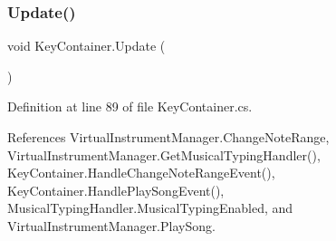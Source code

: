 \mbox{\label{group___key_contain_unity_gae0e513a4ef9fd25c1e0f5f3bc53d9b5c}} 
\subsubsection{\texorpdfstring{Update()}{Update()}}
{\footnotesize\ttfamily void Key\+Container.\+Update (\begin{DoxyParamCaption}{ }\end{DoxyParamCaption})\hspace{0.3cm}{\ttfamily [private]}}



Definition at line 89 of file Key\+Container.\+cs.



References Virtual\+Instrument\+Manager.\+Change\+Note\+Range, Virtual\+Instrument\+Manager.\+Get\+Musical\+Typing\+Handler(), Key\+Container.\+Handle\+Change\+Note\+Range\+Event(), Key\+Container.\+Handle\+Play\+Song\+Event(), Musical\+Typing\+Handler.\+Musical\+Typing\+Enabled, and Virtual\+Instrument\+Manager.\+Play\+Song.


